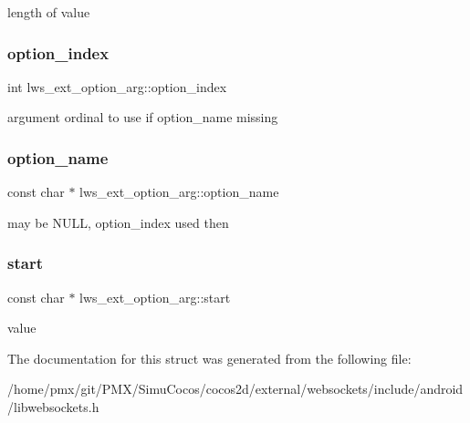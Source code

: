length of value \mbox{\label{structlws__ext__option__arg_af57fffcfa253dfa8d98681ac1fb1785f}} 
\subsubsection{\texorpdfstring{option\+\_\+index}{option\_index}}
{\footnotesize\ttfamily int lws\+\_\+ext\+\_\+option\+\_\+arg\+::option\+\_\+index}

argument ordinal to use if option\+\_\+name missing \mbox{\label{structlws__ext__option__arg_a9765ac0e65c7be451a91ff334554d606}} 
\subsubsection{\texorpdfstring{option\+\_\+name}{option\_name}}
{\footnotesize\ttfamily const char $\ast$ lws\+\_\+ext\+\_\+option\+\_\+arg\+::option\+\_\+name}

may be N\+U\+LL, option\+\_\+index used then \mbox{\label{structlws__ext__option__arg_a7d2fa369f803951a60d7ccc659ab9336}} 
\subsubsection{\texorpdfstring{start}{start}}
{\footnotesize\ttfamily const char $\ast$ lws\+\_\+ext\+\_\+option\+\_\+arg\+::start}

value 

The documentation for this struct was generated from the following file\+:\begin{DoxyCompactItemize}
\item 
/home/pmx/git/\+P\+M\+X/\+Simu\+Cocos/cocos2d/external/websockets/include/android/libwebsockets.\+h\end{DoxyCompactItemize}
